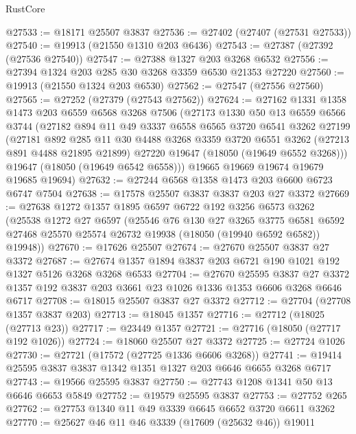 \begin{lexlean}{RustCore}
\begin{coremodule}
@27533 := @18171 @25507 @3837
@27536 := @27402 (@27407 (@27531 @27533))
@27540 := @19913 (@21550 @1310 @203 @6436)
@27543 := @27387 (@27392 (@27536 @27540))
@27547 := @27388 @1327 @203 @3268 @6532
@27556 := @27394 @1324 @203 @285 @30 @3268 @3359 @6530 @21353 @27220
@27560 := @19913 (@21550 @1324 @203 @6530)
@27562 := @27547 (@27556 @27560)
@27565 := @27252 (@27379 (@27543 @27562))
@27624 := @27162
    @1331
    @1358
    @1473
    @203
    @6559
    @6568
    @3268
    @7506
    (@27173
      @1330
      @50
      @13
      @6559
      @6566
      @3744
      (@27182
        @894
        @11
        @49
        @3337
        @6558
        @6565
        @3720
        @6541
        @3262
        @27199
        (@27181
          @892
          @285
          @11
          @30
          @4488
          @3268
          @3359
          @3720
          @6551
          @3262
          (@27213 @891 @4488 @21895 @21899)
          @27220
          @19647
          (@18050 (@19649 @6552 @3268)))
        @19647
        (@18050 (@19649 @6542 @6558)))
      @19665
      @19669
      @19674
      @19679
      @19685
      @19694)
@27632 := @27244 @6568 @1358 @1473 @203 @6600 @6723 @6747 @7504
@27638 := @17578 @25507 @3837 @3837 @203 @27 @3372
@27669 := @27638
    @1272
    @1357
    @1895
    @6597
    @6722
    @192
    @3256
    @6573
    @3262
    (@25538
      @1272
      @27
      @6597
      (@25546
        @76
        @130
        @27
        @3265
        @3775
        @6581
        @6592
        @27468
        @25570
        @25574
        @26732
        @19938
        (@18050 (@19940 @6592 @6582))
        @19948))
@27670 := @17626 @25507
@27674 := @27670 @25507 @3837 @27 @3372
@27687 := @27674 @1357 @1894 @3837 @203 @6721 @190 @1021 @192 @1327 @5126 @3268 @3268 @6533
@27704 := @27670
    @25595
    @3837
    @27
    @3372
    @1357
    @192
    @3837
    @203
    @3661
    @23
    @1026
    @1336
    @1353
    @6606
    @3268
    @6646
    @6717
@27708 := @18015 @25507 @3837 @27 @3372
@27712 := @27704 (@27708 @1357 @3837 @203)
@27713 := @18045 @1357
@27716 := @27712 (@18025 (@27713 @23))
@27717 := @23449 @1357
@27721 := @27716 (@18050 (@27717 @192 @1026))
@27724 := @18060 @25507 @27 @3372
@27725 := @27724 @1026
@27730 := @27721 (@17572 (@27725 @1336 @6606 @3268))
@27741 := @19414 @25595 @3837 @3837 @1342 @1351 @1327 @203 @6646 @6655 @3268 @6717
@27743 := @19566 @25595 @3837
@27750 := @27743 @1208 @1341 @50 @13 @6646 @6653 @5849
@27752 := @19579 @25595 @3837
@27753 := @27752 @265
@27762 := @27753 @1340 @11 @49 @3339 @6645 @6652 @3720 @6611 @3262
@27770 := @25627 @46 @11 @46 @3339 (@17609 (@25632 @46)) @19011

\end{coremodule}
\end{lexlean}
